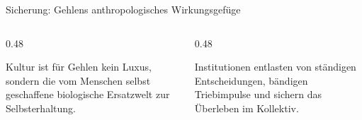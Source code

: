 \documentclass[aspectratio=169, 10pt]{beamer}
\begin{document}
\begin{frame}{Sicherung: Gehlens anthropologisches Wirkungsgefüge}
    \vspace{-0.1cm}
    \begin{columns}[T]
        \begin{column}{0.48\textwidth}
            \begin{tcolorbox}[infoCard, title={\scriptsize\textbf{Kompensation \& \glqq Zweite Natur\grqq}}]
                \tiny
                Kultur ist für Gehlen kein Luxus, sondern die vom Menschen selbst geschaffene biologische Ersatzwelt zur Selbsterhaltung.
            \end{tcolorbox}
        \end{column}
        \begin{column}{0.48\textwidth}
            \begin{tcolorbox}[modernCard, colframe=accentGreen, colback=accentGreen!8, title={\scriptsize\textbf{Die Funktion der Institutionen}}]
                \tiny
                Institutionen entlasten von ständigen Entscheidungen, bändigen Triebimpulse und sichern das Überleben im Kollektiv.
            \end{tcolorbox}
        \end{column}
    \end{columns}
\end{frame}
\end{document}
